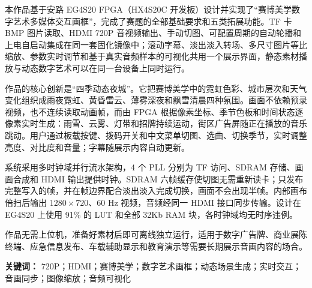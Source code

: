 本作品基于安路 EG4S20 FPGA（HX4S20C 开发板）设计并实现了“赛博美学数字艺术多媒体交互画框”，完成了赛题的全部基础要求和五类拓展功能。TF 卡 BMP 图片读取、HDMI 720P 音视频输出、手动切图、可配置周期的自动轮播和上电自启动集成在同一套固化镜像中；滚动字幕、淡出淡入转场、多尺寸图片等比缩放、参数实时调节和基于真实音频样本的可视化共用一个展示界面，静态素材播放与动态数字艺术可以在同一台设备上同时运行。

作品的核心创新是“四季动态夜城”。它把赛博美学中的霓虹色彩、城市层次和天气变化组织成雨夜霓虹、黄昏雷云、薄雾深夜和飘雪清晨四种氛围。画面不依赖预录视频，也不连续读取动画帧，而由 FPGA 根据像素坐标、季节色板和时间状态逐像素实时生成：雨雪、云雾、灯带和招牌持续运动，街区广告屏随正在播放的音乐跳动。用户通过板载按键、拨码开关和中文菜单切图、选曲、切换季节，实时调整亮度、对比度和音量；字幕随展示内容自动更新。

系统采用多时钟域并行流水架构，4 个 PLL 分别为 TF 访问、SDRAM 存储、画面合成和 HDMI 输出提供时钟。SDRAM 六帧缓存使切图无需重新读卡；只发布完整写入的帧，并在帧边界配合淡出淡入完成切换，画面不会出现半帧。内部画布倍扫后输出 $1280\times720$、60 Hz 视频，音频经同一 HDMI 接口同步传输。设计在 EG4S20 上使用 91\% 的 LUT 和全部 32Kb RAM 块，各时钟域均无时序违例。

作品无需上位机，准备好素材后即可离线独立运行，适用于数字广告牌、商业展陈终端、应急信息发布、车载辅助显示和教育演示等需要长期展示音画内容的场合。

\noindent\textbf{关键词：} \mbox{720P}；\mbox{HDMI}；\mbox{赛博美学}；\mbox{数字艺术画框}；\mbox{动态场景生成}；\mbox{实时交互}；\mbox{音画同步}；\mbox{图像缩放}；\mbox{音频可视化}
